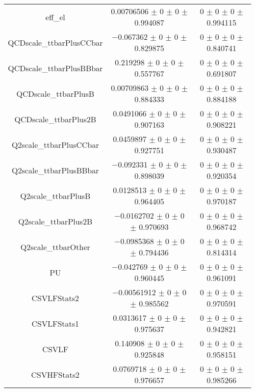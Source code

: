 \begin{table}
\begin{tabular}{ccc}
eff\_el & \num{0.00706506} $\pm$ \num{0} $\pm$ \num{0} $\pm$ \num{0.994087} & \num{0} $\pm$ \num{0} $\pm$ \num{0} $\pm$ \num{0.994115}\\
QCDscale\_ttbarPlusCCbar & \num{-0.067362} $\pm$ \num{0} $\pm$ \num{0} $\pm$ \num{0.829875} & \num{0} $\pm$ \num{0} $\pm$ \num{0} $\pm$ \num{0.840741}\\
QCDscale\_ttbarPlusBBbar & \num{0.219298} $\pm$ \num{0} $\pm$ \num{0} $\pm$ \num{0.557767} & \num{0} $\pm$ \num{0} $\pm$ \num{0} $\pm$ \num{0.691807}\\
QCDscale\_ttbarPlusB & \num{0.00709863} $\pm$ \num{0} $\pm$ \num{0} $\pm$ \num{0.884333} & \num{0} $\pm$ \num{0} $\pm$ \num{0} $\pm$ \num{0.884188}\\
QCDscale\_ttbarPlus2B & \num{0.0491066} $\pm$ \num{0} $\pm$ \num{0} $\pm$ \num{0.907163} & \num{0} $\pm$ \num{0} $\pm$ \num{0} $\pm$ \num{0.908221}\\
Q2scale\_ttbarPlusCCbar & \num{0.0459897} $\pm$ \num{0} $\pm$ \num{0} $\pm$ \num{0.927751} & \num{0} $\pm$ \num{0} $\pm$ \num{0} $\pm$ \num{0.930487}\\
Q2scale\_ttbarPlusBBbar & \num{-0.092331} $\pm$ \num{0} $\pm$ \num{0} $\pm$ \num{0.898039} & \num{0} $\pm$ \num{0} $\pm$ \num{0} $\pm$ \num{0.920354}\\
Q2scale\_ttbarPlusB & \num{0.0128513} $\pm$ \num{0} $\pm$ \num{0} $\pm$ \num{0.964405} & \num{0} $\pm$ \num{0} $\pm$ \num{0} $\pm$ \num{0.970187}\\
Q2scale\_ttbarPlus2B & \num{-0.0162702} $\pm$ \num{0} $\pm$ \num{0} $\pm$ \num{0.970693} & \num{0} $\pm$ \num{0} $\pm$ \num{0} $\pm$ \num{0.968742}\\
Q2scale\_ttbarOther & \num{-0.0985368} $\pm$ \num{0} $\pm$ \num{0} $\pm$ \num{0.794436} & \num{0} $\pm$ \num{0} $\pm$ \num{0} $\pm$ \num{0.814314}\\
PU & \num{-0.042769} $\pm$ \num{0} $\pm$ \num{0} $\pm$ \num{0.960445} & \num{0} $\pm$ \num{0} $\pm$ \num{0} $\pm$ \num{0.961091}\\
CSVLFStats2 & \num{-0.00561912} $\pm$ \num{0} $\pm$ \num{0} $\pm$ \num{0.985562} & \num{0} $\pm$ \num{0} $\pm$ \num{0} $\pm$ \num{0.970591}\\
CSVLFStats1 & \num{0.0313617} $\pm$ \num{0} $\pm$ \num{0} $\pm$ \num{0.975637} & \num{0} $\pm$ \num{0} $\pm$ \num{0} $\pm$ \num{0.942821}\\
CSVLF & \num{0.140908} $\pm$ \num{0} $\pm$ \num{0} $\pm$ \num{0.925848} & \num{0} $\pm$ \num{0} $\pm$ \num{0} $\pm$ \num{0.958151}\\
CSVHFStats2 & \num{0.0769718} $\pm$ \num{0} $\pm$ \num{0} $\pm$ \num{0.976657} & \num{0} $\pm$ \num{0} $\pm$ \num{0} $\pm$ \num{0.985266}\\

\end{tabular}
\end{table}
